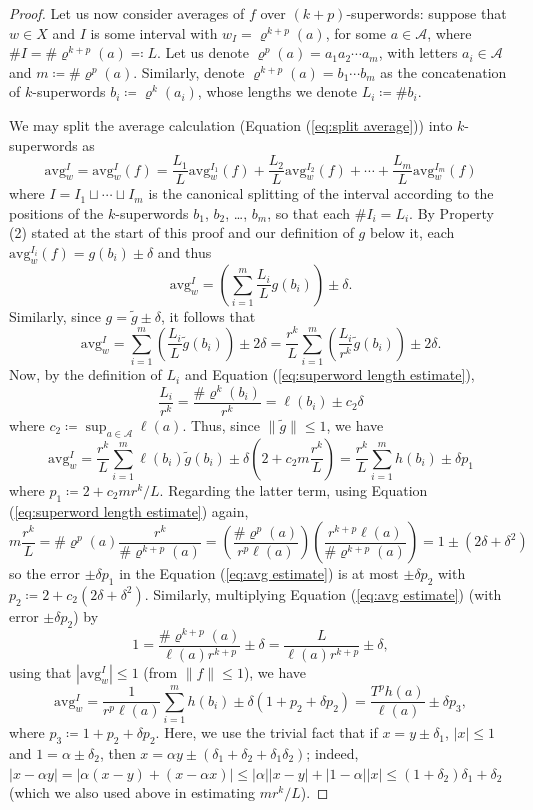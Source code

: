 \documentclass[11pt]{amsart}
\numberwithin{equation}{section}
\theoremstyle{plain}
\theoremstyle{definition}
\newcommand{\mc}{\mathcal}
\newcommand{\A}{\mc A}
\newcommand{\sub}{\varrho}
\newcommand{\avg}{\mathrm{avg}}
\begin{document}
\begin{proof}
Let us now consider averages of \(f\) over \((k+p)\)-superwords: suppose that \(w \in X\) and \(I\) is some interval with \(w_I = \sub^{k+p}(a)\), for some \(a \in \A\), where \(\# I = \# \sub^{k+p}(a) \eqqcolon L\). Let us denote \(\sub^p(a) = a_1 a_2 \cdots a_m\), with letters \(a_i \in \A\) and \(m \coloneqq \# \sub^p(a)\). Similarly, denote \(\sub^{k+p}(a) = b_1 \cdots b_m\) as the concatenation of \(k\)-superwords \(b_i \coloneqq \sub^k(a_i)\), whose lengths we denote \(L_i \coloneqq \# b_i\).

We may split the average calculation (Equation (\ref{eq:split average})) into \(k\)-superwords as
\[
\avg_w^I = \avg_w^I(f) = \frac{L_1}{L} \avg_w^{I_1}(f) + \frac{L_2}{L} \avg_w^{I_2}(f) + \cdots + \frac{L_m}{L} \avg_w^{I_m}(f) 
\]
where \(I = I_1 \sqcup \cdots \sqcup I_m\) is the canonical splitting of the interval according to the positions of the \(k\)-superwords \(b_1\), \(b_2\), \ldots, \(b_m\), so that each \(\#I_i = L_i\). By Property (2) stated at the start of this proof and our definition of \(g\) below it, each \(\avg_w^{I_i}(f) = g(b_i) \pm \delta\) and thus
\[
\avg_w^I = \left(\sum_{i=1}^m \frac{L_i}{L} g(b_i)\right) \pm \delta .
\]
Similarly, since \(g = \widetilde{g} \pm \delta\), it follows that
\[
\avg_w^I = \sum_{i=1}^m \left( \frac{L_i}{L} \widetilde{g}(b_i) \right) \pm  2\delta = \frac{r^k}{L} \sum_{i=1}^m \left( \frac{L_i}{r^k} \widetilde{g}(b_i) \right) \pm  2\delta.
\]
Now, by the definition of \(L_i\) and Equation (\ref{eq:superword length estimate}),
\[
\frac{L_i}{r^k} = \frac{\# \sub^k(b_i)}{r^k} = \ell(b_i) \pm c_2 \delta 
\]
where \(c_2 \coloneqq \sup_{a \in \A} \ell(a)\). Thus, since \(\| \widetilde{g} \| \leq 1\), we have
\begin{equation} \label{eq:avg estimate}
\avg_w^I = \frac{r^k}{L} \sum_{i=1}^m \ell(b_i) \widetilde{g}(b_i) \pm  \delta\left( 2 + c_2 m \frac{r^k}{L} \right) = \frac{r^k}{L} \sum_{i=1}^m h(b_i) \pm  \delta p_1
\end{equation}
where \(p_1 \coloneqq 2 + c_2 m r^k / L\). Regarding the latter term, using Equation (\ref{eq:superword length estimate}) again,
\[
m \frac{r^k}{L} = \# \sub^p(a) \frac{r^k}{ \# \sub^{k+p}(a)} = \left(\frac{\# \sub^p(a)}{r^p \ell(a)} \right) \left( \frac{r^{k+p} \ell(a)}{\# \sub^{k+p}(a) } \right) = 1 \pm (2\delta + \delta^2) 
\]
so the error \(\pm \delta p_1\) in the Equation (\ref{eq:avg estimate}) is at most \(\pm \delta p_2\) with \(p_2 \coloneqq 2 + c_2(2\delta + \delta^2)\). Similarly, multiplying Equation (\ref{eq:avg estimate}) (with error \(\pm \delta p_2\)) by
\[
1 = \frac{\# \sub^{k+p}(a)}{\ell(a) r^{k+p}} \pm \delta = \frac{L}{\ell(a) r^{k+p}} \pm \delta ,
\]
using that \(|\avg_w^I| \leq 1\) (from \(\|f\| \leq 1\)), we have
\[
\avg_w^I = \frac{1}{r^p \ell(a)} \sum_{i=1}^m h(b_i) \pm \delta (1 + p_2 + \delta p_2) = \frac{T^p h(a)}{\ell(a)} \pm \delta p_3,
\]
where \(p_3 \coloneqq 1 + p_2 + \delta p_2\). Here, we use the trivial fact that if \(x = y \pm \delta_1\), \(|x| \leq 1\) and \(1 = \alpha \pm \delta_2\), then \(x = \alpha y \pm (\delta_1 + \delta_2 + \delta_1 \delta_2)\); indeed, \(|x-\alpha y| = |\alpha(x-y) + (x-\alpha x)| \leq |\alpha| |x-y| + |1-\alpha||x| \leq (1+\delta_2)\delta_1 + \delta_2\) (which we also used above in estimating \(mr^k / L\)).


\end{proof}
\end{document}
